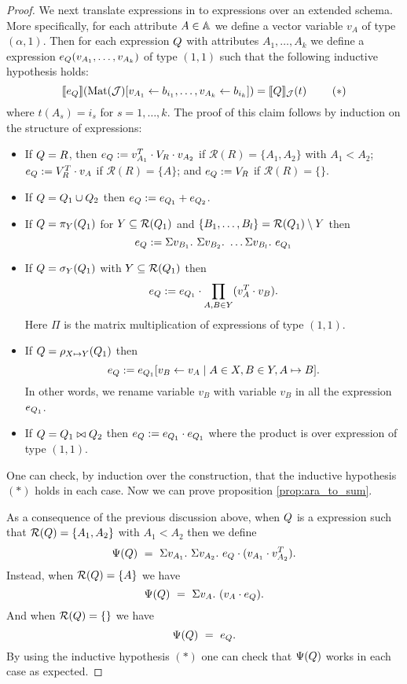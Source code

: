 \begin{proof}
We next translate \rak expressions in to \langsum expressions over an extended schema. More specifically, for each attribute $A \in \mathbb{A}$ we define a vector variable $v_A$ of type $(\alpha,1)$. Then for each \rak expression $Q$ with attributes $A_1, \ldots, A_k$ we define a \langsum expression $e_{Q}(v_{A_1}, \ldots, v_{A_k})$ of type $(1,1)$ such that the following inductive hypothesis holds:
$$
\llbracket e_{Q} \rrbracket(\text{Mat}(\mathcal{J})[v_{A_1} \gets b_{i_1},\ldots, v_{A_k} \gets b_{i_k}]) = 
\llbracket Q \rrbracket_{\mathcal{J}}(t) \ \ \ \ \ \ \  (*)
$$
where $t(A_s)=i_s$ for $s=1,\ldots, k$. The proof of this claim follows by induction on the structure of expressions:
\begin{itemize} \itemsep3mm
	\item If $Q=R$, then $e_{Q}:=v_{A_1}^T \cdot V_R \cdot v_{A_2}$ if $\mathcal{R}(R)=\{A_1,A_2\}$ with $A_1<A_2$; 
	$e_{Q}:=V_R^T \cdot v_A$ if $\mathcal{R}(R)=\{A\}$; and 
	$e_{Q}:=V_R$ if $\mathcal{R}(R)=\{\}$.
	\item If $Q=Q_1\cup Q_2$ then
	$e_{Q}:=e_{Q_1} + e_{Q_2}$.
	\item If $Q=\pi_{Y}(Q_1)$ for $Y\subseteq \mathcal{R}(Q_1)$ and $\{B_1, \ldots, B_l\} = \mathcal{R}(Q_1) \setminus Y$ then
	$$
	\earae:= \Sigma v_{B_1}. \ \Sigma v_{B_2}. \ \ldots \Sigma v_{B_l}. \ e_{\arae_1}
	$$
	\item If $Q=\sigma_{Y}(Q_1)$ with $Y\subseteq\mathcal{R}(Q_1)$ then
	$$
	e_{Q}:=e_{Q_1}\cdot \prod_{A,B\in Y} (v_{A}^T \cdot v_{B}).
	$$
	Here $\Pi$ is the matrix multiplication of expressions of type $(1,1)$.
	\item If $Q=\rho_{X\mapsto Y}(Q_1)$ then
	$$e_{Q}:=e_{Q_1}[v_B\gets v_A\mid A\in X, B\in Y, A\mapsto B].$$
	In other words, we rename variable $v_B$ with variable $v_B$ in all the expression $e_{Q_1}$. 
	\item If $Q=Q_1\bowtie Q_2$ then
	$e_{Q}:=e_{Q_1} \cdot e_{Q_1}$ where the product is over expression of type $(1,1)$.
\end{itemize}
One can check, by induction over the construction, that the inductive hypothesis $(*)$ holds in each case.
Now we can prove proposition \ref{prop:ara_to_sum}.
	
As a consequence of the previous discussion above, when $Q$ is a \rak expression 
such that $\mathcal{R}(Q)=\{A_1,A_2\}$ with $A_1<A_2$ then we define
$$
\Psi(Q) \ = \ \Sigma v_{A_1}. \ \Sigma v_{A_2}. \ e_{Q} \cdot (v_{A_1} \cdot v_{A_2}^T). 
$$
Instead, when $\mathcal{R}(Q)=\{A\}$ we have
$$
\Psi(Q) \ = \ \Sigma v_{A}. \  (v_{A} \cdot e_{Q}). 
$$
And when $\mathcal{R}(Q)=\{\}$ we have
$$
\Psi(Q) \ = \ e_{Q}.
$$
By using the inductive hypothesis $(*)$ one can check that $\Psi(Q)$ works in each case as expected. 
\end{proof}
 